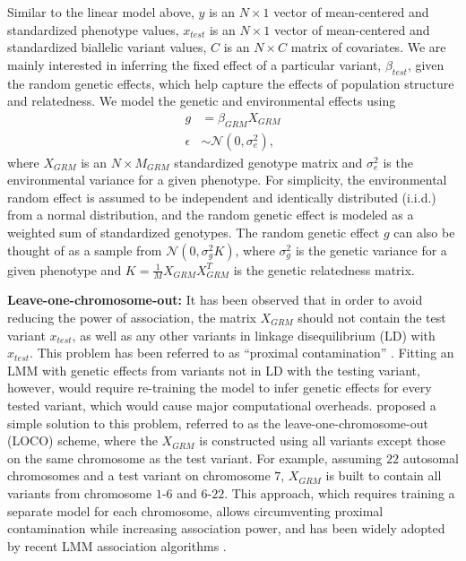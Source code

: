 Similar to the linear model above, $y$ is an $N \times 1$ vector of mean-centered and standardized phenotype values, $x_{test}$ is an $N \times 1$ vector of mean-centered and standardized biallelic variant values, $C$ is an $N \times C$ matrix of covariates.
%
We are mainly interested in inferring the fixed effect of a particular variant, $\beta_{test}$, given the random genetic effects, which help capture the effects of population structure and relatedness.
%
We model the genetic and environmental effects using
\begin{align}
    g &= \beta_{GRM} X_{GRM} \nonumber \\
    \epsilon &\sim  \mathcal{N}(0, \sigma^2_e) \label{lmm-1},
\end{align}
where $X_{GRM}$ is an $N \times M_{GRM}$ standardized genotype matrix and $\sigma^2_e$ is the environmental variance for a given phenotype.
%
For simplicity, the environmental random effect is assumed to be independent and identically distributed (i.i.d.) from a normal distribution, and the random genetic effect is modeled as a weighted sum of standardized genotypes. The random genetic effect $g$ can also be thought of as a sample from $\mathcal{N}(0, \sigma^2_g K)$, where $\sigma^2_g$ is the genetic variance for a given phenotype and $K = \frac{1}{M}X_{GRM}X_{GRM}^T$ is the genetic relatedness matrix.




\textbf{Leave-one-chromosome-out: }
%
It has been observed that in order to avoid reducing the power of association, the matrix $X_{GRM}$ should not contain the test variant $x_{test}$, as well as any other variants in linkage disequilibrium (LD) with $x_{test}$.
%
This problem has been referred to as ``proximal contamination'' \cite{listgarten2012improved}.
%
Fitting an LMM with genetic effects from variants not in LD with the testing variant, however, would require re-training the model to infer genetic effects for every tested variant, which would cause major computational overheads.
%
\cite{yang2014advantages} proposed a simple solution to this problem, referred to as the leave-one-chromosome-out (LOCO) scheme, where the $X_{GRM}$ is constructed using all variants except those on the same chromosome as the test variant.
%
For example, assuming $22$ autosomal chromosomes and a test variant on chromosome $7$, $X_{GRM}$ is built to contain all variants from chromosome $1$-$6$ and $6$-$22$.
%
This approach, which requires training a separate model for each chromosome, allows circumventing proximal contamination while increasing association power, and has been widely adopted by recent LMM association algorithms \cite{loh2015efficient,loh2018mixed,jiang2019resource}.
%

